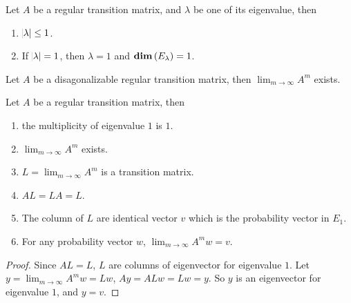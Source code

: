 \begin{theorem}
    Let $A$ be a regular transition matrix, and $\lambda$ be one of its eigenvalue, then
    \begin{enumerate}
        \item $\abs{\lambda} \leq 1$.
        \item If $\abs{\lambda} = 1$, then $\lambda = 1$ and $\displaystyle \mathbf{dim}\left( E_\lambda \right) = 1$.
    \end{enumerate}    
\end{theorem}

\begin{theorem}
    Let $A$ be a disagonalizable regular transition matrix, then $\displaystyle \lim_{m \rightarrow \infty} A^m$ exists.
\end{theorem}

\begin{theorem}
    Let $A$ be a regular transition matrix, then
    \begin{enumerate}
        \item the multiplicity of eigenvalue $1$ is $1$.
        \item $\displaystyle \lim_{m \rightarrow \infty} A^m$ exists.
        \item $L = \displaystyle \lim_{m \rightarrow \infty} A^m$ is a transition matrix.
        \item $AL = LA = L$.
        \item The column of $L$ are identical vector $v$ which is the probability vector in $E_1$.
        \item For any probability vector $w$, $\displaystyle \lim_{m \rightarrow \infty} A^m w = v$.
    \end{enumerate}    
\end{theorem}
\begin{proof}
    Since $AL = L$, $L$ are columns of eigenvector for eigenvalue $1$. Let $y = \displaystyle \lim_{m \rightarrow \infty} A^m w = Lw$, $Ay = ALw = Lw = y$. So $y$ is an eigenvector for eigenvalue $1$, and $y = v$.
\end{proof}













































